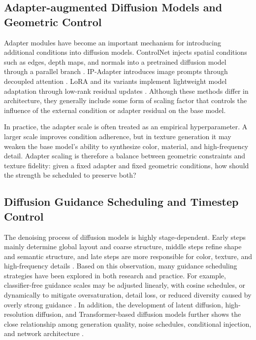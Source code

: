\documentclass[times,twocolumn,final]{elsarticle}
\begin{document}
\subsection{Adapter-augmented Diffusion Models and Geometric Control}
\label{subsec:adapter}

Adapter modules have become an important mechanism for introducing additional conditions into diffusion models. ControlNet injects spatial conditions such as edges, depth maps, and normals into a pretrained diffusion model through a parallel branch \cite{zhang2023controlnet}. IP-Adapter introduces image prompts through decoupled attention \cite{ye2023ipadapter}. LoRA and its variants implement lightweight model adaptation through low-rank residual updates \cite{hu2022lora,liu2024dora,zhang2023adalora}. Although these methods differ in architecture, they generally include some form of scaling factor that controls the influence of the external condition or adapter residual on the base model.

In practice, the adapter scale is often treated as an empirical hyperparameter. A larger scale improves condition adherence, but in texture generation it may weaken the base model's ability to synthesize color, material, and high-frequency detail. Adapter scaling is therefore a balance between geometric constraints and texture fidelity: given a fixed adapter and fixed geometric conditions, how should the strength be scheduled to preserve both?

\subsection{Diffusion Guidance Scheduling and Timestep Control}
\label{subsec:guidance}

The denoising process of diffusion models is highly stage-dependent. Early steps mainly determine global layout and coarse structure, middle steps refine shape and semantic structure, and late steps are more responsible for color, texture, and high-frequency details \cite{ho2020ddpm,song2021ddim}. Based on this observation, many guidance scheduling strategies have been explored in both research and practice. For example, classifier-free guidance scales may be adjusted linearly, with cosine schedules, or dynamically to mitigate oversaturation, detail loss, or reduced diversity caused by overly strong guidance \cite{ho2022cfg,castillo2023adaptive}. In addition, the development of latent diffusion, high-resolution diffusion, and Transformer-based diffusion models further shows the close relationship among generation quality, noise schedules, conditional injection, and network architecture \cite{rombach2022ldm,esser2024scaling,blackforestlabs2024flux,loshchilov2019decoupled,cherti2023reproducible,nichol2022glide,saharia2022photorealistic,peebles2023scalable}.
\end{document}
